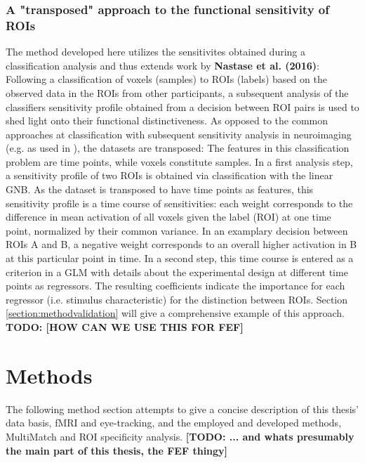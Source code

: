 \documentclass[a4paper, 12pt]{scrreprt}
\begin{document}
{\subsection{A "transposed" approach to the functional sensitivity of ROIs}
The method developed here utilizes the sensitivites obtained during a classification analysis and thus extends work by \textbf{Nastase et al. (2016)}: Following a classification of voxels (samples) to ROIs (labels) based on the observed data in the ROIs from other participants, a subsequent analysis of the classifiers sensitivity profile obtained from a decision between ROI pairs is used to shed light onto their functional distinctiveness. As opposed to the common approaches at classification with subsequent sensitivity analysis in neuroimaging (e.g. as used in \textcite{poldrack2009decoding}), the datasets are transposed: The features in this classification problem are time points, while voxels constitute samples. \newline
In a first analysis step, a sensitivity profile of two ROIs is obtained via classification with the linear GNB. As the dataset is transposed to have time points as features, this sensitivity profile is a time course of sensitivities: each weight corresponds to the difference in mean activation of all voxels given the label (ROI) at one time point, normalized by their common variance. In an examplary decision between ROIs A and B, a negative weight corresponds to an overall higher activation in B at this particular point in time. In a second step, this time course is entered as a criterion in a GLM with details about the experimental design at different time points as regressors. The resulting coefficients indicate the importance for each regressor (i.e. stimulus characteristic) for the distinction between ROIs. Section \ref{section:methodvalidation} will give a comprehensive example of this approach. \newline
\textbf{ TODO: [HOW CAN WE USE THIS FOR FEF]}


\chapter{Methods}\label{section:methods}

The following method section attempts to give a concise description of this thesis' data basis, fMRI and eye-tracking, and the employed and developed methods, MultiMatch and ROI specificity analysis.  \textbf{[TODO: ... and whats presumably the main part of this thesis, the FEF thingy]}

}
\end{document}
